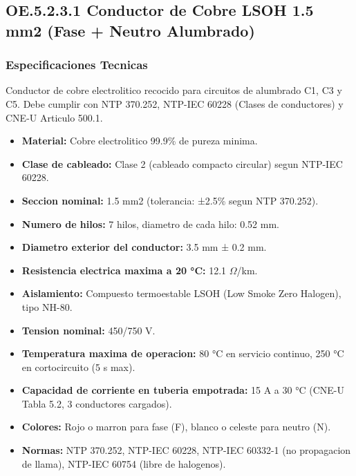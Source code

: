\subsection{OE.5.2.3.1 Conductor de Cobre LSOH 1.5 mm2 (Fase + Neutro Alumbrado)}

\subsubsection{Especificaciones Tecnicas}

Conductor de cobre electrolitico recocido para circuitos de alumbrado C1, C3 y C5. Debe cumplir con NTP 370.252, NTP-IEC 60228 (Clases de conductores) y CNE-U Articulo 500.1.

\begin{itemize}[nosep]
  \item \textbf{Material:} Cobre electrolitico 99.9\% de pureza minima.
  \item \textbf{Clase de cableado:} Clase 2 (cableado compacto circular) segun NTP-IEC 60228.
  \item \textbf{Seccion nominal:} 1.5 mm2 (tolerancia: ±2.5\% segun NTP 370.252).
  \item \textbf{Numero de hilos:} 7 hilos, diametro de cada hilo: 0.52 mm.
  \item \textbf{Diametro exterior del conductor:} 3.5 mm ± 0.2 mm.
  \item \textbf{Resistencia electrica maxima a 20 °C:} 12.1 $\Omega$/km.
  \item \textbf{Aislamiento:} Compuesto termoestable LSOH (Low Smoke Zero Halogen), tipo NH-80.
  \item \textbf{Tension nominal:} 450/750 V.
  \item \textbf{Temperatura maxima de operacion:} 80 °C en servicio continuo, 250 °C en cortocircuito (5 s max).
  \item \textbf{Capacidad de corriente en tuberia empotrada:} 15 A a 30 °C (CNE-U Tabla 5.2, 3 conductores cargados).
  \item \textbf{Colores:} Rojo o marron para fase (F), blanco o celeste para neutro (N).
  \item \textbf{Normas:} NTP 370.252, NTP-IEC 60228, NTP-IEC 60332-1 (no propagacion de llama), NTP-IEC 60754 (libre de halogenos).
\end{itemize}

